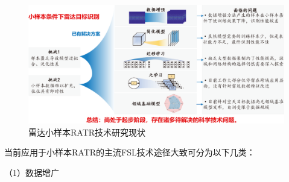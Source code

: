 \begin{figure}[h]
    \centering
    \includegraphics[width=\linewidth]{figures/review.pdf} %
    \caption{雷达小样本RATR技术研究现状}
    \label{fig:meta_learning_paradigms}
\end{figure}

当前应用于小样本RATR的主流FSL技术途径大致可分为以下几类：

（1）数据增广


